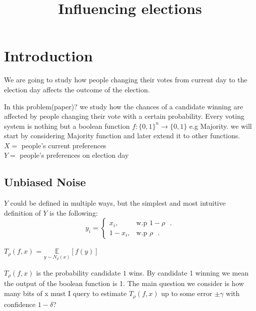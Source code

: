 \documentclass[11pt]{article}
\title{Influencing elections}
\date{}
\begin{document}
\maketitle
\section{Introduction}
We are going to study how people changing their votes from current day to the election day affects the outcome of the election. 

In this problem(paper)? we study how the chances of a candidate winning are affected by people changing their vote with a certain probability. %
Every voting system is nothing but a boolean function 
 $f:\{0,1\}^{n} \rightarrow \{0,1\}$ e.g Majority.
we will start by considering Majority function and later extend it to other functions.\\
\noindent
 $X =$  people's current preferences \\ \noindent
 $Y =$  people's preferences on election day

\subsection{Unbiased Noise}

$Y$ could be defined in multiple ways, but the simplest and most intuitive definition of $Y$ is the following:
\begin{equation*}
 y_i  =\begin{cases}
 x_i , & \text{w.p  $1-\rho$ }.\\
 1-x_i , & \text{w.p  $\rho$ }.
\end{cases}
\end{equation*}


 \BD $T_{\rho}(f,x)$ = $\underset{y \sim N_{\rho}(x)}{\mathbb{E}}[f(y)]$ 
 \ED 
 
\noindent $T_{\rho}(f,x)$ is the probability candidate $1$ wins. By candidate 1 winning we mean the output of the boolean function is 1. The main question we consider is how many bits of x must I query to estimate $T_{\rho}(f,x)$ up to some error $\pm \gamma $ with confidence $1-\delta$? 
\end{document}
